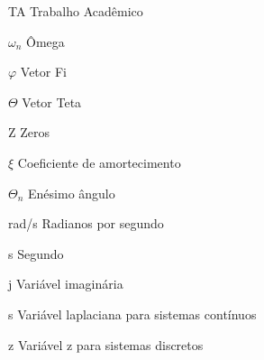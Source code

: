 \listoffigures*
\cleardoublepage

\listoftables*
\cleardoublepage

\listoflistings
\cleardoublepage

\begin{siglas}												%
    \item[TA]               Trabalho Acadêmico
	\item[$\omega _n $]     Ômega
	\item[$\varphi $]       Vetor Fi
	\item[$\Theta $]        Vetor Teta
	\item[Z]                Zeros
\end{siglas}

\begin{simbolos}											%
	\item[$\xi $]           Coeficiente de amortecimento
    \item[$\Theta  _n $]    Enésimo ângulo
	\item[rad/s]            Radianos por segundo
	\item[s]                Segundo
    \item[j]                Variável imaginária
    \item[s]	            Variável laplaciana para sistemas contínuos
    \item[z]                Variável z para sistemas discretos
\end{simbolos}

\tableofcontents*
\cleardoublepage